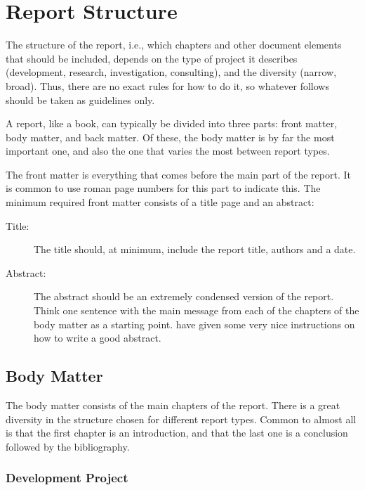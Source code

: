 \section{Report Structure}

The structure of the report, i.e., which chapters and other document elements that should be included, depends on the type of project it describes (development, research, investigation, consulting), and the diversity (narrow, broad). Thus, there are no exact rules for how to do it, so whatever follows should be taken as guidelines only.

A report, like a book, can typically be divided into three parts: front matter, body matter, and back matter. Of these, the body matter is by far the most important one, and also the one that varies the most between report types.


\label{sec:frontmatter}

The front matter is everything that comes before the main part of the report. It is common to use roman page numbers for this part to indicate this. The minimum required front matter consists of a title page and an abstract:

\begin{description}
    \item[Title:] The title should, at minimum, include the report title, authors and a date.
    \item[Abstract:] The abstract should be an extremely condensed version of the report. Think one sentence with the main message from each of the chapters of the body matter as a starting point. \textcite{landes1951scrutiny} have given some very nice instructions on how to write a good abstract.
\end{description}

\subsection{Body Matter}

The body matter consists of the main chapters of the report. There is a great diversity in the structure chosen for different report types. Common to almost all is that the first chapter is an introduction, and that the last one is a conclusion followed by the bibliography.

\subsubsection{Development Project}
\label{sec:development}


